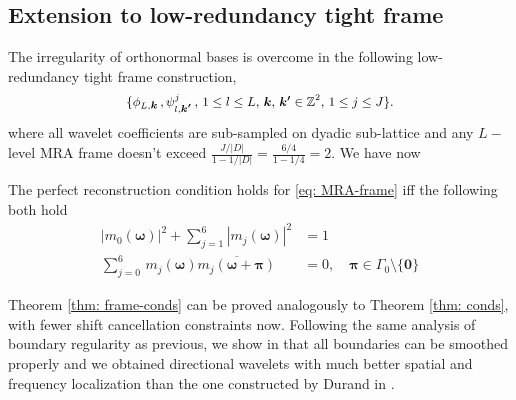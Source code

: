 \subsection{Extension to low-redundancy tight frame}\label{sec: frame}
The irregularity of orthonormal bases is overcome in the following low-redundancy tight frame construction,
 \begin{align}\label{eq: MRA-frame}
 \{\phi_{L,\boldsymbol{k}}\,,\psi^j_{l,\boldsymbol{k'}}\,, \, {\small 1\leq l \leq L,\, \boldsymbol{k},\,\boldsymbol{k'}\in \mathbb{Z}^2,\,1\leq j \leq J\}}.
\end{align}  
where all wavelet coefficients are sub-sampled on dyadic sub-lattice and any $L-$level MRA frame doesn't exceed $\frac{J/|D|}{1-1/|D|} = \frac{6/4}{1-1/4} = 2$.
We have now
\begin{thm}\label{thm: frame-conds}
The perfect reconstruction condition holds for \eqref{eq: MRA-frame} iff the following both hold
\begin{align}
\textstyle |m_0(\boldsymbol{\omega})|^2 + \sum_{j = 1}^6|m_j(\boldsymbol{\omega})|^2 &= 1 \\
\textstyle\sum_{j = 0}^6\,m_j(\boldsymbol{\omega})\overline{m_j(\boldsymbol{\omega} + \boldsymbol{\pi})} &= 0,\quad  \boldsymbol{\pi}\in \Gamma_0\setminus\{\boldsymbol{0}\} \label{eq: reduced-shift-cancel}
\end{align}
\end{thm}
Theorem \ref{thm: frame-conds} can be proved analogously to Theorem \ref{thm: conds}, 
with fewer shift cancellation constraints now. Following the same analysis of boundary regularity as previous, we show in \cite{yin2014orthshear} that all boundaries can be smoothed properly and we obtained directional wavelets with much better spatial and frequency localization than the one constructed by Durand in \cite{durand2007}. 
